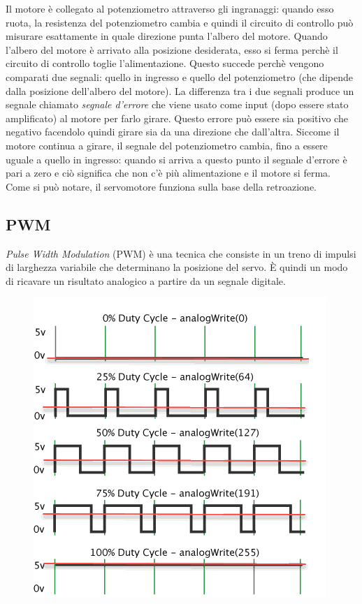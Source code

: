 \documentclass[12pt]{report}
\begin{document}
Il motore è collegato al potenziometro attraverso gli ingranaggi: quando esso ruota, la resistenza del potenziometro cambia e quindi il circuito di controllo può misurare esattamente in quale direzione punta l'albero del motore. Quando l'albero del motore è arrivato alla posizione desiderata, esso si ferma perchè il circuito di controllo toglie l'alimentazione. Questo succede perchè vengono comparati due segnali: quello in ingresso e quello del potenziometro (che dipende dalla posizione dell'albero del motore). La differenza tra i due segnali produce un segnale chiamato \emph{segnale d'errore} che viene usato come input (dopo essere stato amplificato) al motore per farlo girare. Questo errore può essere sia positivo che negativo facendolo quindi girare sia da una direzione che dall'altra. Siccome il motore continua a girare, il segnale del potenziometro cambia, fino a essere uguale a quello in ingresso: quando si arriva a questo punto il segnale d'errore è pari a zero e ciò significa che non c'è più alimentazione e il motore si ferma. Come si può notare, il servomotore funziona sulla base della retroazione.

%
\subsection{PWM}
%

\emph{Pulse Width Modulation} (PWM) è una tecnica che consiste in un treno di impulsi di larghezza variabile che determinano la posizione del servo. È quindi un modo di ricavare un risultato analogico a partire da un segnale digitale. 

\begin{figure}
	\begin{center}
		\includegraphics[width=0.9\linewidth]{./img/pwm.png}
		\label{fig:pwm}
	\end{center}
\end{figure}
\end{document}
